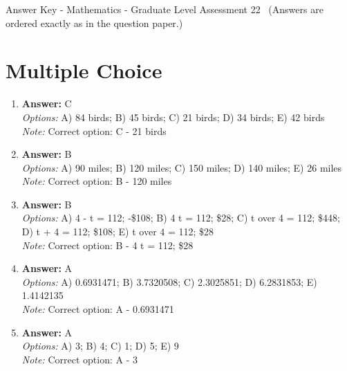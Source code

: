 \documentclass[12pt]{article}
\begin{document}
\begin{center}
Answer Key - Mathematics - Graduate Level Assessment 22 \
\small (Answers are ordered exactly as in the question paper.)
\end{center}

\section*{Multiple Choice}
\begin{enumerate}[label=\arabic*.]
\item \textbf{Answer:} C
\\ \textit{Options:} A) 84 birds; B) 45 birds; C) 21 birds; D) 34 birds; E) 42 birds
\\ \textit{Note:} Correct option: C - 21 birds
\item \textbf{Answer:} B
\\ \textit{Options:} A) 90 miles; B) 120 miles; C) 150 miles; D) 140 miles; E) 26 miles
\\ \textit{Note:} Correct option: B - 120 miles
\item \textbf{Answer:} B
\\ \textit{Options:} A) 4 - t = 112; -\$108; B) 4 t = 112; \$28; C) t over 4 = 112; \$448; D) t + 4 = 112; \$108; E) t over 4 = 112; \$28
\\ \textit{Note:} Correct option: B - 4 t = 112; \$28
\item \textbf{Answer:} A
\\ \textit{Options:} A) 0.6931471; B) 3.7320508; C) 2.3025851; D) 6.2831853; E) 1.4142135
\\ \textit{Note:} Correct option: A - 0.6931471
\item \textbf{Answer:} A
\\ \textit{Options:} A) 3; B) 4; C) 1; D) 5; E) 9
\\ \textit{Note:} Correct option: A - 3
\end{enumerate}
\end{document}
